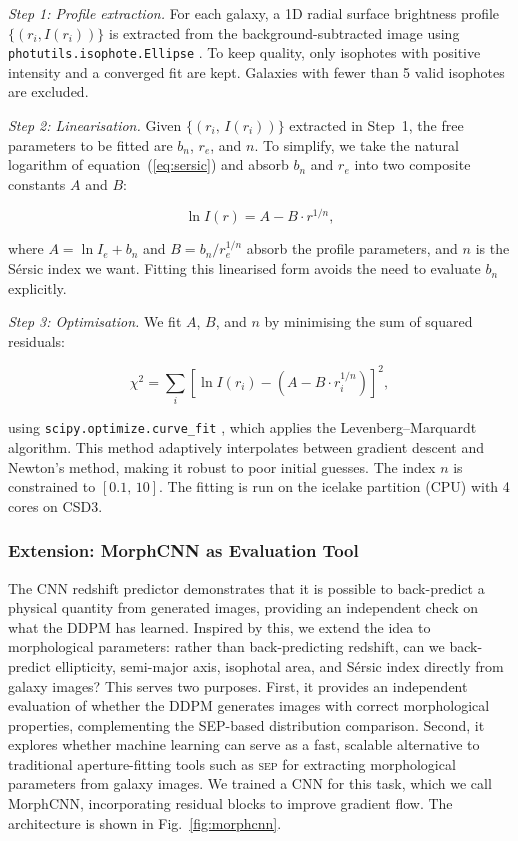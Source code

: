 \documentclass[fleqn,usenatbib]{mnras}
\begin{document}
\textit{Step 1: Profile extraction.}
For each galaxy, a 1D radial surface brightness profile $\{(r_i, I(r_i))\}$
is extracted from the background-subtracted image using
\texttt{photutils.isophote.Ellipse} \citep{photutils}. To keep quality,
only isophotes with positive intensity and a converged fit are kept.
Galaxies with fewer than 5 valid isophotes are excluded.

\textit{Step 2: Linearisation.}
Given 
$\{(r_i,\,I(r_i))\}$ extracted in Step~1,
the free parameters to be fitted are $b_n$, $r_e$, and $n$.
To simplify, we take the natural logarithm of equation~(\ref{eq:sersic}) and
absorb $b_n$ and $r_e$ into two composite constants $A$ and $B$:

\begin{equation}
    \ln I(r) = A - B \cdot r^{1/n},
    \label{eq:sersic_log}
\end{equation}

where $A = \ln I_e + b_n$ and $B = b_n / r_e^{1/n}$ absorb the
profile parameters, and $n$ is the S\'{e}rsic index we want.
Fitting this linearised form avoids the need to evaluate $b_n$
explicitly.

\textit{Step 3: Optimisation.}
We fit $A$, $B$, and $n$ by minimising the sum of squared residuals:

\begin{equation}
    \chi^2 = \sum_i \left[\ln I(r_i) - \left(A - B \cdot r_i^{1/n}\right)\right]^2,
    \label{eq:sersic_chi2}
\end{equation}

using \texttt{scipy.optimize.curve\_fit} \citep{virtanen2020}, which
applies the Levenberg--Marquardt algorithm.
This method adaptively interpolates between gradient descent and
Newton's method, making it robust to poor initial guesses.
The index $n$ is constrained to $[0.1,\, 10]$.
The fitting is run on the icelake partition (CPU) with 4 cores on CSD3.

\subsubsection{Extension: MorphCNN as Evaluation Tool}
\label{sec:morphcnn}

The CNN redshift predictor demonstrates that it is possible to
back-predict a physical quantity from generated images, providing
an independent check on what the DDPM has learned.
Inspired by this, we extend the idea to morphological parameters:
rather than back-predicting redshift, can we back-predict
ellipticity, semi-major axis, isophotal area, and Sérsic index
directly from galaxy images?
This serves two purposes.
First, it provides an independent evaluation of whether the DDPM
generates images with correct morphological properties, complementing
the SEP-based distribution comparison.
Second, it explores whether machine learning can serve as a fast,
scalable alternative to traditional aperture-fitting tools such as
\textsc{sep} for extracting morphological parameters from galaxy images.
We trained a CNN for this task, which we call MorphCNN, incorporating
residual blocks \citep{he2016} to improve gradient flow.
The architecture is shown in Fig.~\ref{fig:morphcnn}.
\end{document}
